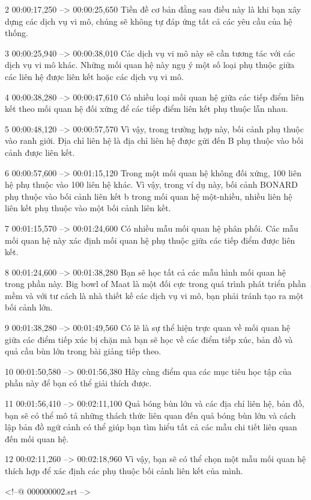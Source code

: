 2
00:00:17,250 --> 00:00:25,650
Tiền đề cơ bản đằng sau điều này là khi bạn xây dựng các dịch vụ vi mô, chúng sẽ không tự đáp ứng tất cả các yêu cầu của hệ thống.

3
00:00:25,940 --> 00:00:38,010
Các dịch vụ vi mô này sẽ cần tương tác với các dịch vụ vi mô khác.  Những mối quan hệ này ngụ ý một số loại phụ thuộc giữa các liên hệ được liên kết hoặc các dịch vụ vi mô.

4
00:00:38,280 --> 00:00:47,610
Có nhiều loại mối quan hệ giữa các tiếp điểm liên kết theo mối quan hệ đối xứng để các tiếp điểm liên kết phụ thuộc lẫn nhau.

5
00:00:48,120 --> 00:00:57,570
Vì vậy, trong trường hợp này, bối cảnh phụ thuộc vào ranh giới.  Địa chỉ liên hệ là địa chỉ liên hệ được gửi đến B phụ thuộc vào bối cảnh được liên kết.

6
00:00:57,600 --> 00:01:15,120
Trong một mối quan hệ không đối xứng, 100 liên hệ phụ thuộc vào 100 liên hệ khác.  Vì vậy, trong ví dụ này, bối cảnh BONARD phụ thuộc vào bối cảnh liên kết b trong mối quan hệ một-nhiều, nhiều liên hệ liên kết phụ thuộc vào một bối cảnh liên kết.

7
00:01:15,570 --> 00:01:24,600
Có nhiều mẫu mối quan hệ phân phối.  Các mẫu mối quan hệ này xác định mối quan hệ phụ thuộc giữa các tiếp điểm được liên kết.

8
00:01:24,600 --> 00:01:38,280
Bạn sẽ học tất cả các mẫu hình mối quan hệ trong phần này.  Big bowl of Maat là một đối cực trong quá trình phát triển phần mềm và với tư cách là nhà thiết kế các dịch vụ vi mô, bạn phải tránh tạo ra một bối cảnh lớn.

9
00:01:38,280 --> 00:01:49,560
Có lẽ là sự thể hiện trực quan về mối quan hệ giữa các điểm tiếp xúc bị chặn mà bạn sẽ học về các điểm tiếp xúc, bản đồ và quả cầu bùn lớn trong bài giảng tiếp theo.

10
00:01:50,580 --> 00:01:56,380
Hãy cùng điểm qua các mục tiêu học tập của phần này để bạn có thể giải thích được.

11
00:01:56,410 --> 00:02:11,100
Quả bóng bùn lớn và các địa chỉ liên hệ, bản đồ, bạn sẽ có thể mô tả những thách thức liên quan đến quả bóng bùn lớn và cách lập bản đồ ngữ cảnh có thể giúp bạn tìm hiểu tất cả các mẫu chi tiết liên quan đến mối quan hệ.

12
00:02:11,260 --> 00:02:18,960
Vì vậy, bạn sẽ có thể chọn một mẫu mối quan hệ thích hợp để xác định các phụ thuộc bối cảnh liên kết của mình.

<!--@ 000000002.srt -->

